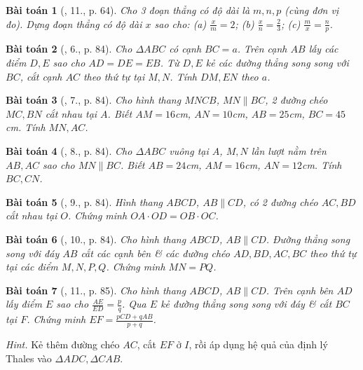 \documentclass{article}
\newtheorem{baitoan}{Bài toán}
\begin{document}
\begin{baitoan}[\cite{SGK_Toan_8_tap_2}, 11., p. 64]
	Cho 3 đoạn thẳng có độ dài là $m,n,p$ (cùng đơn vị đo). Dựng đoạn thẳng có độ dài $x$ sao cho: (a) $\frac{x}{m} = 2$; (b) $\frac{x}{n} = \frac{2}{3}$; (c) $\frac{m}{x} = \frac{n}{p}$.
\end{baitoan}

\begin{baitoan}[\cite{SBT_Toan_8_tap_2}, 6., p. 84]
	Cho $\Delta ABC$ có cạnh $BC = a$. Trên cạnh $AB$ lấy các điểm $D,E$ sao cho $AD = DE = EB$. Từ $D,E$ kẻ các đường thẳng song song với $BC$, cắt cạnh $AC$ theo thứ tự tại $M,N$. Tính $DM,EN$ theo $a$.	
\end{baitoan}

\begin{baitoan}[\cite{SBT_Toan_8_tap_2}, 7., p. 84]
	Cho hình thang $MNCB$, $MN\parallel BC$, 2 đường chéo $MC,BN$ cắt nhau tại $A$. Biết $AM = 16$\emph{cm}, $AN = 10$\emph{cm}, $AB = 25$\emph{cm}, $BC = 45$\emph{cm}. Tính $MN,AC$.
\end{baitoan}

\begin{baitoan}[\cite{SBT_Toan_8_tap_2}, 8., p. 84]
	Cho $\Delta ABC$ vuông tại $A$, $M,N$ lần lượt nằm trên $AB,AC$ sao cho $MN\parallel BC$. Biết $AB = 24$\emph{cm}, $AM = 16$\emph{cm}, $AN = 12$\emph{cm}. Tính $BC,CN$.
\end{baitoan}

\begin{baitoan}[\cite{SBT_Toan_8_tap_2}, 9., p. 84]
	Hình thang $ABCD$, $AB\parallel CD$, có 2 đường chéo $AC,BD$ cắt nhau tại $O$. Chứng minh $OA\cdot OD = OB\cdot OC$.
\end{baitoan}

\begin{baitoan}[\cite{SBT_Toan_8_tap_2}, 10., p. 84]
	Cho hình thang $ABCD$, $AB\parallel CD$. Đường thẳng song song với đáy $AB$ cắt các cạnh bên \& các đường chéo $AD,BD,AC,BC$ theo thứ tự tại các điểm $M,N,P,Q$. Chứng minh $MN = PQ$.
\end{baitoan}

\begin{baitoan}[\cite{SBT_Toan_8_tap_2}, 11., p. 85]
	Cho hình thang $ABCD$, $AB\parallel CD$. Trên cạnh bên $AD$ lấy điểm $E$ sao cho $\frac{AE}{ED} = \frac{p}{q}$. Qua $E$ kẻ đường thẳng song song với đáy \& cắt $BC$ tại $F$. Chứng minh $EF = \frac{pCD + qAB}{p + q}$.
\end{baitoan}
\noindent\textit{Hint.} Kẻ thêm đường chéo $AC$, cắt $EF$ ở $I$, rồi áp dụng hệ quả của định lý Thales vào $\Delta ADC,\Delta CAB$.
\end{document}
